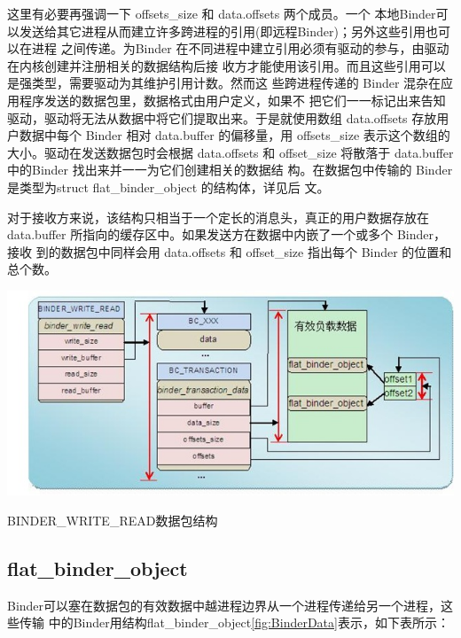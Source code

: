 \documentclass[a4paper,11pt]{article}
\begin{document}
这里有必要再强调一下 offsets_size 和 data.offsets 两个成员。一个
本地Binder可以发送给其它进程从而建立许多跨进程的引用(即远程Binder)；另外这些引用也可以在进程
之间传递。为Binder
在不同进程中建立引用必须有驱动的参与，由驱动在内核创建并注册相关的数据结构后接
收方才能使用该引用。而且这些引用可以是强类型，需要驱动为其维护引用计数。然而这
些跨进程传递的 Binder 混杂在应用程序发送的数据包里，数据格式由用户定义，如果不
把它们一一标记出来告知驱动，驱动将无法从数据中将它们提取出来。于是就使用数组
data.offsets 存放用户数据中每个 Binder 相对 data.buffer 的偏移量，用
offsets_size 表示这个数组的大小。驱动在发送数据包时会根据 data.offsets 和
offset_size 将散落于 data.buffer 中的Binder 找出来并一一为它们创建相关的数据结
构。在数据包中传输的 Binder 是类型为struct flat_binder_object 的结构体，详见后
文\label{BinderTransStructure}。

对于接收方来说，该结构只相当于一个定长的消息头，真正的用户数据存放在
data.buffer 所指向的缓存区中。如果发送方在数据中内嵌了一个或多个 Binder，接收
到的数据包中同样会用 data.offsets 和 offset_size 指出每个 Binder
的位置和总个数。

\begin{minipage}{0.9\linewidth}
\includegraphics[scale=0.66]{binderproto.jpg}

\caption{ BINDER_WRITE_READ数据包结构\label{fig:BinderData}}
\end{minipage}

\subsection{flat_binder_object}
Binder可以塞在数据包的有效数据中越进程边界从一个进程传递给另一个进程，这些传输
中的Binder用结构flat_binder_object\autoref{fig:BinderData}表示，如下表所示：
\end{document}
